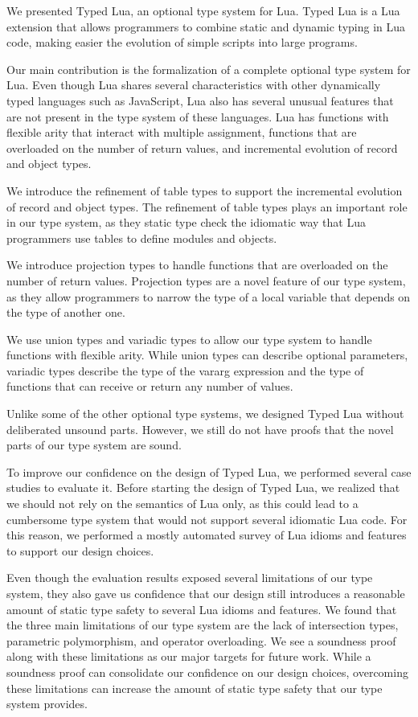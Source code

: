 We presented Typed Lua, an optional type system for Lua.
Typed Lua is a Lua extension that allows programmers to combine static
and dynamic typing in Lua code, making easier the evolution of simple scripts
into large programs.

Our main contribution is the formalization of a complete optional
type system for Lua.
Even though Lua shares several characteristics with other dynamically
typed languages such as JavaScript, Lua also has several unusual features
that are not present in the type system of these languages.
Lua has functions with flexible arity that interact with multiple
assignment, functions that are overloaded on the number of return values,
and incremental evolution of record and object types.

We introduce the refinement of table types to support the incremental
evolution of record and object types.
The refinement of table types plays an important role in our type
system, as they static type check the idiomatic way that Lua programmers
use tables to define modules and objects.

We introduce projection types to handle functions that are overloaded
on the number of return values.
Projection types are a novel feature of our type system, as they
allow programmers to narrow the type of a local variable that depends
on the type of another one.

We use union types and variadic types to allow our type system to
handle functions with flexible arity.
While union types can describe optional parameters, variadic types
describe the type of the vararg expression and the type of functions
that can receive or return any number of values.

Unlike some of the other optional type systems, we designed Typed Lua
without deliberated unsound parts.
However, we still do not have proofs that the novel parts of our type
system are sound.

To improve our confidence on the design of Typed Lua, we performed several
case studies to evaluate it.
Before starting the design of Typed Lua, we realized that we should
not rely on the semantics of Lua only, as this could lead to a
cumbersome type system that would not support several idiomatic Lua code.
For this reason, we performed a mostly automated survey of Lua idioms
and features to support our design choices.

Even though the evaluation results exposed several limitations of our
type system, they also gave us confidence that our design still
introduces a reasonable amount of static type safety to several Lua idioms
and features.
We found that the three main limitations of our type system are
the lack of intersection types, parametric polymorphism, and operator overloading.
We see a soundness proof along with these limitations as our major targets
for future work.
While a soundness proof can consolidate our confidence on our design choices,
overcoming these limitations can increase the amount of static type safety
that our type system provides.

